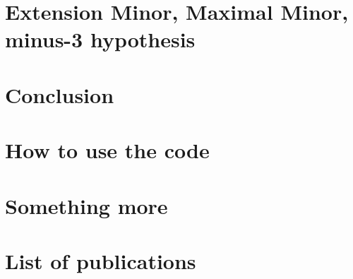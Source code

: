 \documentclass[12pt,twoside]{report}
\begin{document}
\chapter{Extension Minor, Maximal Minor, minus-3 hypothesis  }


\chapter{Conclusion }


\appendix
\chapter{How to use the code}


\chapter{Something more}


\printbibliography


\chapter*{List of publications}
\end{document}
